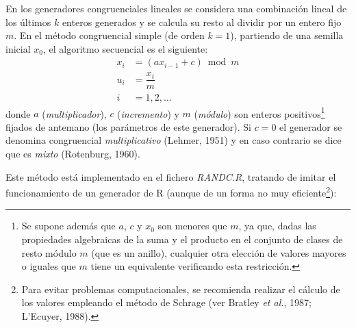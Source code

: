 \documentclass[
]{book}
\theoremstyle{break}
\theoremstyle{definition}
\theoremstyle{definition}
\theoremstyle{definition}
\theoremstyle{remark}
\begin{document}
En los generadores congruenciales lineales se considera una combinación lineal de los últimos \(k\) enteros generados y se calcula su resto al dividir por un entero fijo \(m\).
En el método congruencial simple (de orden \(k = 1\)), partiendo de una semilla inicial \(x_0\), el algoritmo secuencial es el siguiente:
\[\begin{aligned}
x_{i}  & = (ax_{i-1}+c) \bmod m \\
u_{i}  & = \dfrac{x_{i}}{m} \\
i  & =1,2,\ldots
\end{aligned}\]
donde \(a\) (\emph{multiplicador}), \(c\) (\emph{incremento}) y \(m\) (\emph{módulo}) son enteros positivos\footnote{Se supone además que \(a\), \(c\) y \(x_0\) son menores que \(m\), ya que, dadas las propiedades algebraicas de la suma y el producto en el conjunto de clases de resto módulo \(m\) (que es un anillo), cualquier otra elección de valores mayores o iguales que \(m\) tiene un equivalente verificando esta restricción.} fijados de antemano (los parámetros de este generador). Si \(c=0\) el generador se denomina congruencial \emph{multiplicativo} (Lehmer, 1951) y en caso contrario se dice que es \emph{mixto} (Rotenburg, 1960).

Este método está implementado en el fichero \emph{RANDC.R}, tratando de imitar el funcionamiento de un generador de R (aunque de un forma no muy eficiente\footnote{Para evitar problemas computacionales, se recomienda realizar el cálculo de los valores empleando el método de Schrage (ver Bratley \emph{et al.}, 1987; L'Ecuyer, 1988).}):
\end{document}
